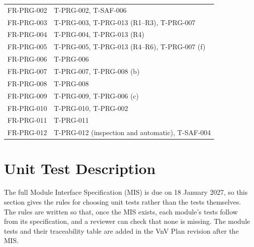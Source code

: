 \documentclass[12pt, titlepage]{article}
\begin{document}
{\begin{longtable}{@{}>{\raggedright\arraybackslash}p{}%
>{\raggedright\arraybackslash}p{}@{}}
FR-PRG-002 & T-PRG-002, T-SAF-006\\
FR-PRG-003 & T-PRG-003, T-PRG-013 (R1--R3), T-PRG-007\\
FR-PRG-004 & T-PRG-004, T-PRG-013 (R4)\\
FR-PRG-005 & T-PRG-005, T-PRG-013 (R4--R6), T-PRG-007 (f)\\
FR-PRG-006 & T-PRG-006\\
FR-PRG-007 & T-PRG-007, T-PRG-008 (b)\\
FR-PRG-008 & T-PRG-008\\
FR-PRG-009 & T-PRG-009, T-PRG-006 (c)\\
FR-PRG-010 & T-PRG-010, T-PRG-002\\
FR-PRG-011 & T-PRG-011\\
FR-PRG-012 & T-PRG-012 (inspection and automatic), T-SAF-004\\
\bottomrule
\end{longtable}}

\section{Unit Test Description}
\label{sec:unit-tests}

The full Module Interface Specification (MIS) is due on 18 January 2027, so this
section gives the rules for choosing unit tests rather than the tests
themselves. The rules are written so that, once the MIS exists, each
module's tests follow from its specification, and a reviewer can check that
none is missing. The module tests and their traceability table are added in
the VnV Plan revision after the MIS.
\end{document}
